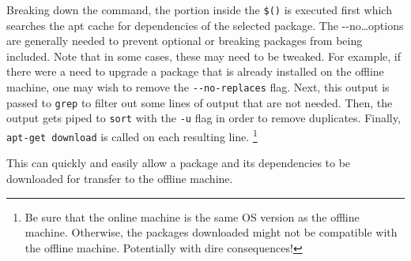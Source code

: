 Breaking down the command, the portion inside the \texttt{\$()} is executed first which searches the apt cache for dependencies of the selected package. The -{}-no\ldots options are generally needed to prevent optional or breaking packages from being included. Note that in some cases, these may need to be tweaked. For example, if there were a need to upgrade a package that is already installed on the offline machine, one may wish to remove the \texttt{-{}-no-replaces} flag. Next, this output is passed to \texttt{grep} to filter out some lines of output that are not needed. Then, the output gets piped to \texttt{sort} with the \texttt{-u} flag in order to remove duplicates. Finally, \texttt{apt-get download} is called on each resulting line.
\footnote{Be sure that the online machine is the same OS version as the offline machine. Otherwise, the packages downloaded might not be compatible with the offline machine. Potentially with dire consequences!}

This can quickly and easily allow a package and its dependencies to be downloaded for transfer to the offline machine.
